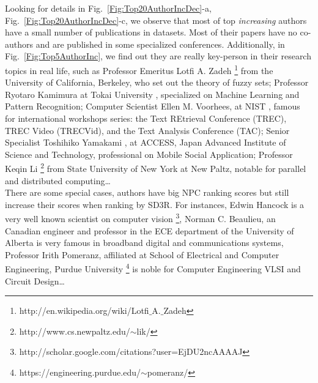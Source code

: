 \documentclass[10pt,leqno,twoside]{article}
\begin{document}
%
Looking for details in Fig.~\ref{Fig:Top20AuthorIncDec}-a, Fig.~\ref{Fig:Top20AuthorIncDec}-c, we observe that most of top \textit{increasing} authors have a small number of publications in datasets. Most of their papers have no co-authors and are published in some specialized conferences. Additionally, in Fig.~\ref{Fig:Top5AuthorInc}, we find out they are really key-person in their research topics in real life, such as 
Professor Emeritus Lotfi A. Zadeh \footnote{http://en.wikipedia.org/wiki/Lotfi$\_$A.$\_$Zadeh} from the University of California, Berkeley, who set out the theory of fuzzy sets;
Professor Ryotaro Kamimura at Tokai University %
, specialized on Machine Learning and Pattern Recognition; 
Computer Scientist Ellen M. Voorhees, at NIST%
, famous for international workshops series: the Text REtrieval Conference (TREC), TREC Video (TRECVid), and the Text Analysis Conference (TAC);
Senior Specialist Toshihiko Yamakami %
, at ACCESS, Japan Advanced Institute of Science and Technology, professional on Mobile Social Application; 
Professor Keqin Li \footnote{http://www.cs.newpaltz.edu/$\sim$lik/} 
from State University of New York at New Paltz, notable for parallel and distributed computing\ldots 
\\
There are some special cases, authors have big NPC ranking scores but still increase their scores when ranking by SD3R. For instances, Edwin Hancock is a very well known scientist on computer vision \footnote{http://scholar.google.com/citations?user=EjDU2ncAAAAJ}, Norman C. Beaulieu, an Canadian engineer and professor in the ECE department of the University of Alberta is very famous in broadband digital and communications systems, Professor Irith Pomeranz, affiliated at School of Electrical and Computer Engineering, Purdue University \footnote{https://engineering.purdue.edu/$\sim$pomeranz/} is noble for Computer Engineering
VLSI and Circuit Design\ldots


%
%
\end{document}
